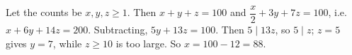 Let the counts be $x,y,z\ge1$. Then $x+y+z=100$ and $\dfrac x2+3y+7z=100$, i.e. $x+6y+14z=200$. Subtracting, $5y+13z=100$. Then $5\mid13z$, so $5\mid z$; $z=5$ gives $y=7$, while $z\ge10$ is too large. So $x=100-12=\boxed{88}$.
